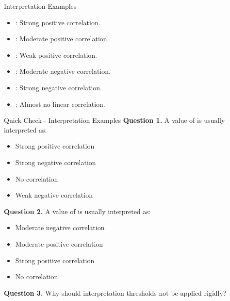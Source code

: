 \documentclass[aspectratio=169,11pt]{beamer}
\begin{document}
\begin{frame}[allowframebreaks]{Interpretation Examples}
\small
\begin{itemize}
\item \texttt{}: Strong positive correlation.
\item \texttt{}: Moderate positive correlation.
\item \texttt{}: Weak positive correlation.
\item \texttt{}: Moderate negative correlation.
\item \texttt{}: Strong negative correlation.
\item \texttt{}: Almost no linear correlation.
\end{itemize}
\end{frame}
\begin{frame}[allowframebreaks]{Quick Check - Interpretation Examples}
\footnotesize
\textbf{Question 1.} A value of \texttt{} is usually interpreted as:\par\medskip
\begin{itemize}
\item[\textbf{A.}] Strong positive correlation
\item[\textbf{B.}] Strong negative correlation
\item[\textbf{C.}] No correlation
\item[\textbf{D.}] Weak negative correlation
\end{itemize}
\textbf{Question 2.} A value of \texttt{} is usually interpreted as:\par\medskip
\begin{itemize}
\item[\textbf{A.}] Moderate negative correlation
\item[\textbf{B.}] Moderate positive correlation
\item[\textbf{C.}] Strong positive correlation
\item[\textbf{D.}] No correlation
\end{itemize}
\textbf{Question 3.} Why should interpretation thresholds not be applied rigidly?\par\medskip
\end{frame}
\end{document}
